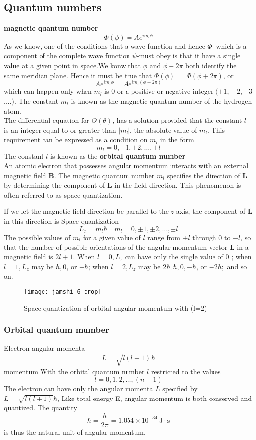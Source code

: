 \subsection{Quantum numbers}
\textbf{magnetic quantum number}
$$\Phi(\phi)=A e^{i m_{l} \phi}$$
As we know, one of the conditions that a wave function-and hence $\Phi$, which is a component of the complete wave function $\psi$-must obey is that it have a single value at a given point in space.We konw that $\phi$ and $\phi+2 \pi$ both identify the same meridian plane. Hence it must be true that $\Phi(\phi)=$ $\Phi(\phi+2 \pi)$, or
$$A e^{i m_{l} \phi}=A e^{i m_{l}(\phi+2 \pi)}$$
which can happen only when $m_{l}$ is 0 or a positive or negative integer $(\pm 1$, $\pm 2, \pm 3$....). The constant $m_{l}$ is known as the magnetic quantum number of the hydrogen atom.\\
The differential equation for $\Theta(\theta)$, has a solution provided that the constant $l$ is an integer equal to or greater than $\left|m_{l}\right|$, the absolute value of $m_{l}$. This requirement can be expressed as a condition on $m_{l}$ in the form
$$
m_{l}=0, \pm 1, \pm 2, \ldots, \pm l
$$
The constant $l$ is known as the \textbf{orbital quantum number}\\
An atomic electron that possesses angular momentum interacts with an external magnetic field $\mathbf{B}$. The magnetic quantum number $m_{l}$ specifies the direction of $\mathbf{L}$ by determining the component of $\mathbf{L}$ in the field direction. This phenomenon is often referred to as space quantization.

If we let the magnetic-field direction be parallel to the $z$ axis, the component of $\mathbf{L}$ in this direction is
Space quantization $$L_{z}=m_{l} \hbar \quad m_{l}=0, \pm 1, \pm 2, \ldots, \pm l$$
The possible values of $m_{l}$ for a given value of $l$ range from $+l$ through 0 to $-l$, so that the number of possible orientations of the angular-momentum vector $\mathbf{L}$ in a magnetic field is $2 l+1$. When $l=0, L_{z}$ can have only the single value of 0 ; when $l=1, L_{z}$ may be $\hbar, 0$, or $-\hbar$; when $l=2, L_{z}$ may be $2 \hbar, \hbar, 0,-\hbar$, or $-2 \hbar ;$ and so on.\\
\begin{figure}[H]
	\centering
	\texttt{[image: jamshi 6-crop]}
	\caption{Space quantization of orbital angular momentum with (l=2)}
	\label{}
\end{figure}
\subsubsection{Orbital quantum mumber}
Electron angular momenta 
$$
L=\sqrt{l(l+1)} \hbar
$$
momentum
With the orbital quantum number $l$ restricted to the values
$$
l=0,1,2, \ldots,(n-1)
$$
The electron can have only the angular momenta $L$ specified by $
L=\sqrt{l(l+1)} \hbar
$, Like total energy E, angular momentum is both conserved and quantized. The quantity
$$
\hbar=\frac{h}{2 \pi}=1.054 \times 10^{-34} \mathrm{~J} \cdot \mathrm{s}
$$
is thus the natural unit of angular momentum.
